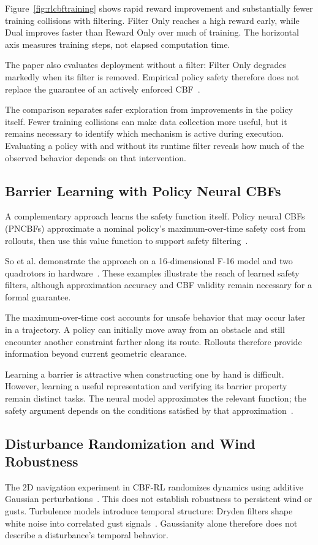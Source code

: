 Figure~\ref{fig:rlcbftraining} shows rapid reward improvement and substantially fewer training collisions with filtering. Filter Only reaches a high reward early, while Dual improves faster than Reward Only over much of training. The horizontal axis measures training steps, not elapsed computation time.

The paper also evaluates deployment without a filter: Filter Only degrades markedly when its filter is removed. Empirical policy safety therefore does not replace the guarantee of an actively enforced CBF~\cite{litCBFRL2026}.

The comparison separates safer exploration from improvements in the policy itself. Fewer training collisions can make data collection more useful, but it remains necessary to identify which mechanism is active during execution. Evaluating a policy with and without its runtime filter reveals how much of the observed behavior depends on that intervention.

\subsection{Barrier Learning with Policy Neural CBFs}
A complementary approach learns the safety function itself. Policy neural CBFs (PNCBFs) approximate a nominal policy's maximum-over-time safety cost from rollouts, then use this value function to support safety filtering~\cite{litPNCBF2023}.

So et al. demonstrate the approach on a 16-dimensional F-16 model and two quadrotors in hardware~\cite{litPNCBF2023}. These examples illustrate the reach of learned safety filters, although approximation accuracy and CBF validity remain necessary for a formal guarantee.

The maximum-over-time cost accounts for unsafe behavior that may occur later in a trajectory. A policy can initially move away from an obstacle and still encounter another constraint farther along its route. Rollouts therefore provide information beyond current geometric clearance.

Learning a barrier is attractive when constructing one by hand is difficult. However, learning a useful representation and verifying its barrier property remain distinct tasks. The neural model approximates the relevant function; the safety argument depends on the conditions satisfied by that approximation~\cite{litPNCBF2023}.

\subsection{Disturbance Randomization and Wind Robustness}
The 2D navigation experiment in CBF-RL randomizes dynamics using additive Gaussian perturbations~\cite{litCBFRL2026}. This does not establish robustness to persistent wind or gusts. Turbulence models introduce temporal structure: Dryden filters shape white noise into correlated gust signals~\cite{litDryden2018}. Gaussianity alone therefore does not describe a disturbance's temporal behavior.

